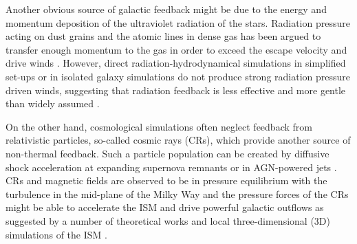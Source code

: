 \documentclass[useAMS,usenatbib]{mnras}
\begin{document}
Another obvious source of galactic feedback might be due to the energy and momentum deposition of the ultraviolet radiation of the stars. Radiation pressure acting on dust grains and the atomic lines in dense gas has been argued to transfer enough momentum to the gas in order to exceed the escape velocity and drive winds \citep{Murray2005,Thompson2005}. However, direct radiation-hydrodynamical simulations in simplified set-ups \citep{Krumholz2012} or in isolated galaxy simulations \citep{Rosdahl2015} do not produce strong radiation pressure driven winds, suggesting that radiation feedback is less effective and more gentle than widely assumed \citep[but see also][]{Emerick2018}.

On the other hand, cosmological simulations often neglect feedback from relativistic particles, so-called cosmic rays (CRs), which provide another source of non-thermal feedback. Such a particle population can be created by diffusive shock acceleration at expanding supernova remnants \citep[e.g.][]{Blandford1987, Jubelgas2008} or in AGN-powered jets \citep[e.g.][]{Sijacki2008,Ehlert2018}. CRs and magnetic fields are observed to be in pressure equilibrium with the turbulence in the mid-plane of the Milky Way \citep{Boulares1990} and the pressure forces of the CRs might be able to accelerate the ISM and drive powerful galactic outflows as suggested by a number of theoretical works \citep{Ipavich1975,Breitschwerdt1991,Breitschwerdt2002,Zirakashvili1996,Ptuskin1997,Socrates2008,Everett2008,Samui2010,Dorfi2012} and local three-dimensional (3D) simulations of the ISM \citep{Hanasz2013,Girichidis2016,Simpson2016}. 
\end{document}
